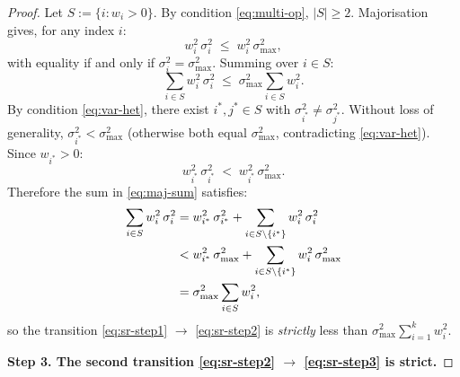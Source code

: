 \documentclass[12pt,openany]{book}
\numberwithin{equation}{chapter}
\theoremstyle{plain}
\theoremstyle{definition}
\theoremstyle{remark}
\numberwithin{equation}{chapter}
\theoremstyle{plain}
\begin{document}
\begin{proof}
\noindent Let $S := \{i : w_i > 0\}$.  By condition \eqref{eq:multi-op},
$|S| \geq 2$.  Majorisation gives, for any index $i$:
\begin{equation}
  w_i^2\,\sigma_i^2 \;\leq\; w_i^2\,\sigma_{\max}^2,
  \label{eq:maj-term}
\end{equation}
with equality if and only if $\sigma_i^2 = \sigma_{\max}^2$.
Summing over $i \in S$:
\begin{equation}
  \sum_{i \in S} w_i^2\,\sigma_i^2
    \;\leq\;
    \sigma_{\max}^2 \sum_{i \in S} w_i^2.
  \label{eq:maj-sum}
\end{equation}
By condition \eqref{eq:var-het}, there exist $i^*, j^* \in S$ with
$\sigma_{i^*}^2 \neq \sigma_{j^*}^2$.  Without loss of generality,
$\sigma_{i^*}^2 < \sigma_{\max}^2$ (otherwise both equal $\sigma_{\max}^2$,
contradicting \eqref{eq:var-het}).  Since $w_{i^*} > 0$:
\begin{equation}
  w_{i^*}^2\,\sigma_{i^*}^2
    \;<\;
    w_{i^*}^2\,\sigma_{\max}^2.
\end{equation}
Therefore the sum in \eqref{eq:maj-sum} satisfies:
\begin{align}
  \sum_{i \in S} w_i^2\,\sigma_i^2
    &= w_{i^*}^2\,\sigma_{i^*}^2
       + \sum_{i \in S \setminus \{i^*\}} w_i^2\,\sigma_i^2 \notag \\
    &< w_{i^*}^2\,\sigma_{\max}^2
       + \sum_{i \in S \setminus \{i^*\}} w_i^2\,\sigma_{\max}^2 \notag \\
    &= \sigma_{\max}^2 \sum_{i \in S} w_i^2,
\end{align}
so the transition \eqref{eq:sr-step1} $\to$ \eqref{eq:sr-step2}
is \emph{strictly} less than $\sigma_{\max}^2 \sum_{i=1}^{k} w_i^2$.

\medskip
\noindent\textbf{Step 3. The second transition \eqref{eq:sr-step2}
  $\to$ \eqref{eq:sr-step3} is strict.}


\end{proof}
\end{document}
